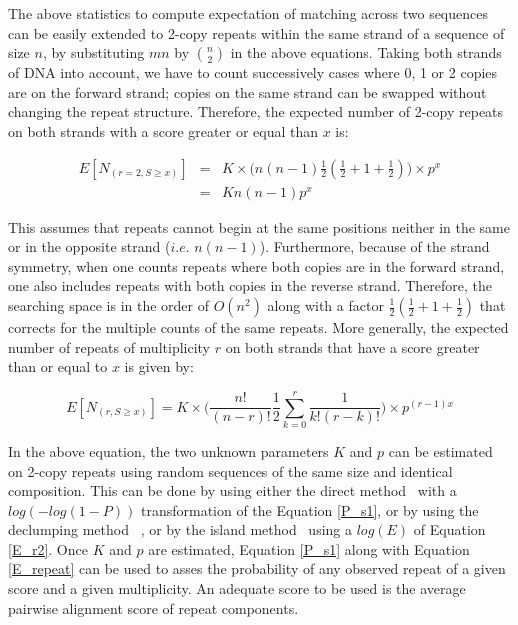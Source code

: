 \documentclass[12pt,journal,draftcls,letterpaper,onecolumn]{IEEEtran}
\begin{document}
The above statistics to compute expectation of matching across two sequences can be easily extended to 2-copy repeats within the same strand of a sequence of size $n$, by substituting $mn$ by ${{n}\choose{2}}$ in the above equations. Taking both strands of DNA into account, we have to count successively cases where 0, 1 or 2 copies are on the forward strand; copies on the same strand can be swapped without changing the repeat structure. Therefore, the expected number of 2-copy repeats on both strands with a score greater or equal than $x$ is:

\begin{eqnarray}
   E[ N_{(r=2, S\geq x)} ]  & = & K \times  \Big( n (n-1) \frac 12 (\frac 1 2 + 1 + \frac 1 2) \Big) \times  p^x \nonumber \\
                                         & = & K  n (n-1)   p^x
   \label{E_r2}
\end{eqnarray}

This assumes that repeats cannot begin at the same positions neither in the same or in the opposite strand ($i.e.$ $n(n-1)$). Furthermore, because of the strand symmetry, when one counts repeats where both copies are in the forward strand, one also includes repeats with both copies in the reverse strand. Therefore, the searching space is in the order of $O(n^2)$ along with a factor $\frac 12 (\frac 1 2 + 1 + \frac 1 2)$ that corrects for the multiple counts of the same repeats. More generally, the expected number of repeats of multiplicity $r$ on both strands that have a score greater than or equal to $x$ is given by:

\begin{equation}
    E[ N_{(r, S\geq x)} ]   =  K \times  \Big( \frac{n!}{(n-r)! }  \frac 12 \sum_{k=0}^{r}{\frac{1}{k! (r-k)!}} \Big) \times  p^{(r-1)x}
    \label{E_repeat}
\end{equation}

In the above equation, the two unknown parameters $K$ and $p$ can be estimated on 2-copy repeats using random sequences of the same size and identical composition.  This can be done by using either the direct method~\cite{Olsen1999} with a $log(-log(1-P))$ transformation of the Equation \ref{P_s1}, or by using the declumping method ~\cite{Waterman1994}, or by the island method~\cite{Olsen1999} using a $log(E)$ of Equation \ref{E_r2}. Once $K$ and $p$ are estimated, Equation \ref{P_s1} along with Equation \ref{E_repeat} can be used to asses the probability of any observed repeat of a given score and a given multiplicity. An adequate score to be used is the average pairwise alignment score of repeat components.
\end{document}
